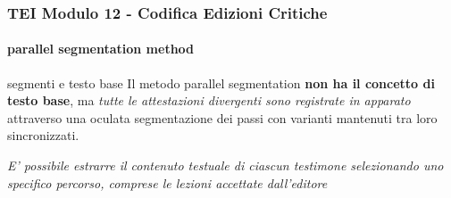 \begin{frame}
    \frametitle{TEI Modulo 12 - Codifica Edizioni Critiche}
    \framesubtitle{parallel segmentation method}
    \addtocounter{nframe}{1}
    






    \begin{block}{segmenti e testo base}
      Il metodo parallel segmentation \textbf{non ha il concetto di testo base}, ma \textit{tutte le attestazioni divergenti sono registrate in apparato} attraverso una oculata segmentazione dei passi con varianti mantenuti tra loro sincronizzati.
    \end{block}

    \textit{E' possibile estrarre il contenuto testuale di ciascun testimone selezionando uno specifico percorso, comprese le lezioni accettate dall'editore}

\end{frame}



